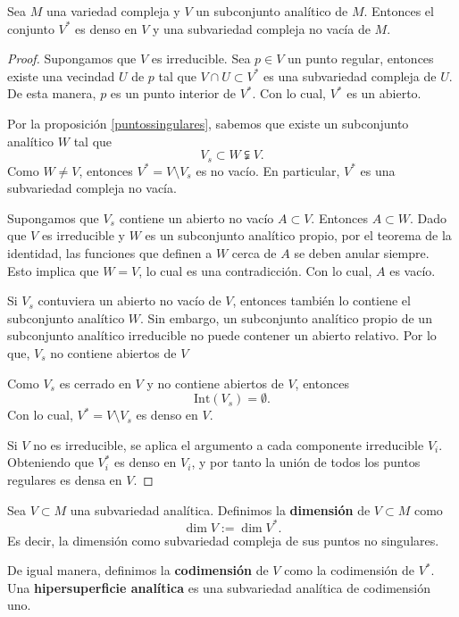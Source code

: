     \begin{corollary}
    	Sea $M$ una variedad compleja y $V$ un subconjunto analítico de $M$. Entonces el conjunto $V^*$ es denso en $V$ y una subvariedad compleja no vacía de $M$.
    \end{corollary}
    \begin{proof}
    	Supongamos que $V$ es irreducible. Sea $p\in V$ un punto regular, entonces existe una vecindad $U$ de $p$ tal que $V\cap U\subset V^*$ es una subvariedad compleja de $U$. De esta manera, $p$ es un punto interior de $V^*$. Con lo cual, $V^*$ es un abierto. 
    	
    	Por la proposición \ref{puntossingulares}, sabemos que existe un subconjunto analítico $W$ tal que
    	\begin{equation*}
    		V_s\subset W\subsetneqq V.
    	\end{equation*}
    	Como $W\neq V$, entonces $V^*=V\setminus V_s$ es no vacío. En particular, $V^*$ es una subvariedad compleja no vacía.
    	
    	Supongamos que $V_s$ contiene un abierto no vacío $A\subset V$. Entonces $A\subset W$. Dado que $V$ es irreducible y $W$ es un subconjunto analítico propio, por el teorema de la identidad, las funciones que definen a $W$ cerca de $A$ se deben anular siempre. Esto implica que $W=V$, lo cual es una contradicción. Con lo cual, $A$ es vacío.
    	
    	Si $V_s$ contuviera un abierto no vacío de $V$, entonces también lo contiene el subconjunto analítico $W$. Sin embargo, un subconjunto analítico propio de un subconjunto analítico irreducible no puede contener un abierto relativo. Por lo que, $V_s$ no contiene abiertos de $V$
    	
    	Como $V_s$ es cerrado en $V$ y no contiene abiertos de $V$, entonces
    	\begin{equation*}
    		\mathrm{Int}(V_s)=\emptyset.
    	\end{equation*}
    	Con lo cual, $V^*=V\setminus V_s$ es denso en $V$.
    	
    	Si $V$ no es irreducible, se aplica el argumento a cada componente irreducible $V_i$. Obteniendo que $V_i^*$ es denso en $V_i$, y por tanto la unión de todos los puntos regulares es densa en $V$.
    \end{proof}
    
    \begin{definition}
    	Sea $V\subset M$ una subvariedad analítica. Definimos la \textbf{dimensión} de $V\subset M$ como
    	\begin{equation*}
    		\dim V:=\dim V^*.
    	\end{equation*}
    	Es decir, la dimensión como subvariedad compleja de sus puntos no singulares.
    	
    	De igual manera, definimos la \textbf{codimensión} de $V$ como la codimensión de $V^*$.
    	Una \textbf{hipersuperficie analítica} es una subvariedad analítica de codimensión uno.
    \end{definition}
    
